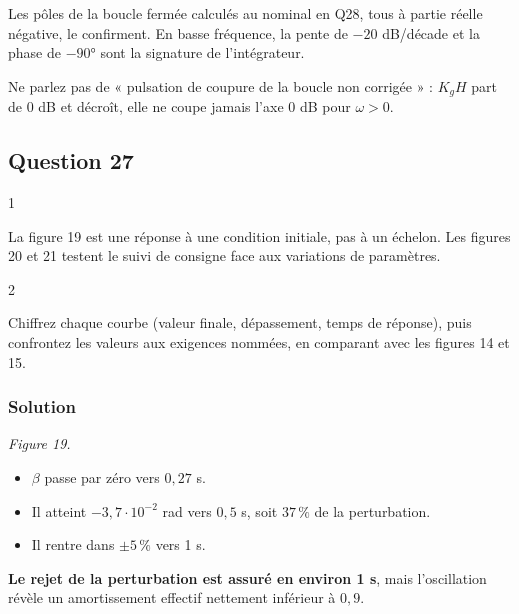 \documentclass[11pt,a4paper]{article}
\providecommand{\tightlist}{\setlength{\itemsep}{0pt}\setlength{\parskip}{0pt}}
\begin{document}
Les pôles de la boucle fermée calculés au nominal en Q28, tous à partie réelle négative, le confirment. En basse fréquence, la pente de \(-20\) dB/décade et la phase de \(-90°\) sont la signature de l'intégrateur.

\begin{piege}

Ne parlez pas de « pulsation de coupure de la boucle non corrigée » : \(K_gH\) part de 0 dB et décroît, elle ne coupe jamais l'axe 0 dB pour \(\omega>0\).

\end{piege}

\hypertarget{question-27}{%
\subsection{Question 27}\label{question-27}}

\begin{indication}{1}

La figure 19 est une réponse à une condition initiale, pas à un échelon. Les figures 20 et 21 testent le suivi de consigne face aux variations de paramètres.

\end{indication}

\begin{indication}{2}

Chiffrez chaque courbe (valeur finale, dépassement, temps de réponse), puis confrontez les valeurs aux exigences nommées, en comparant avec les figures 14 et 15.

\end{indication}

\hypertarget{solution-26}{%
\subsubsection{Solution}\label{solution-26}}

\emph{Figure 19.}

\begin{itemize}
\tightlist
\item
  \(\beta\) passe par zéro vers \(0{,}27\) s.
\item
  Il atteint \(-3{,}7\cdot10^{-2}\) rad vers \(0{,}5\) s, soit \(37\,\%\) de la perturbation.
\item
  Il rentre dans \(\pm5\,\%\) vers 1 s.
\end{itemize}

\textbf{Le rejet de la perturbation est assuré en environ 1 s}, mais l'oscillation révèle un amortissement effectif nettement inférieur à \(0{,}9\).
\end{document}

